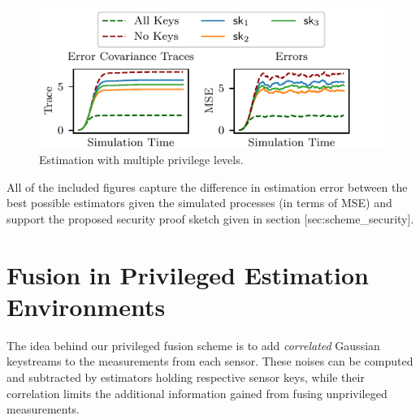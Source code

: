 \begin{figure}[htbp]
   \centering
   \includegraphics{figures/multiple_level.pdf}
   \caption{Estimation with multiple privilege levels.}
   \label{fig:multiple_bounded}
\end{figure}

All of the included figures capture the difference in estimation error between the best possible estimators given the simulated processes (in terms of MSE) and support the proposed security proof sketch given in section [sec:scheme\_security].


% 
%                                                                                             
%                                                                                             
%                                                                                             
% 

\section{Fusion in Privileged Estimation Environments}\label{sec:priv_estimation:privileged_fusion}
The idea behind our privileged fusion scheme is to add \textit{correlated} Gaussian keystreams to the measurements from each sensor. These noises can be computed and subtracted by estimators holding respective sensor keys, while their correlation limits the additional information gained from fusing unprivileged measurements. 

